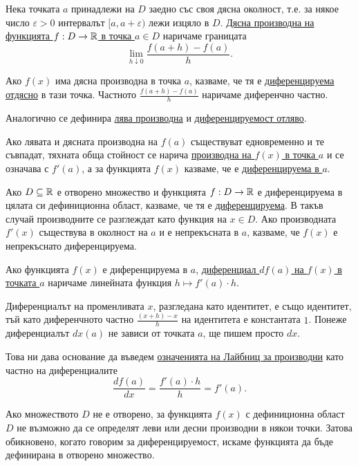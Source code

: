 \documentclass[numbers=endperiod, DIV=15, bibliography=totocnumbered]{scrartcl}
\begin{document}
\begin{definition}
  Нека точката $a$ принадлежи на $D$ заедно със своя дясна околност, т.е. за някое число $\varepsilon > 0$ интервалът $[a, a + \varepsilon)$ лежи изцяло в $D$. \uline{Дясна производна на функцията $f: D \to \mathbb{R}$ в точка $a \in D$} наричаме границата
  \begin{displaymath}
    \lim_{h \downarrow 0} \frac {f(a + h) - f(a)} h.
  \end{displaymath}

  Ако $f(x)$ има дясна производна в точка $a$, казваме, че тя е \uline{диференцируема отдясно} в тази точка.
  Частното $\frac {f(a + h) - f(a)} h$ наричаме диференчно частно.

  Аналогично се дефинира \uline{лява производна} и \uline{диференцируемост отляво}.

  Ако лявата и дясната производна на $f(a)$ съществуват едновременно и те съвпадат, тяхната обща стойност се нарича \uline{производна на $f(x)$ в точка $a$} и се означава с $f'(a)$, а за функцията $f(x)$ казваме, че е \uline{диференцируема в $a$}.

  Ако $D \subseteq \mathbb{R}$ е отворено множество и функцията $f: D \to \mathbb{R}$ е диференцируема в цялата си дефиниционна област, казваме, че тя е \uline{диференцируема}. В такъв случай производните се разглеждат като функция на $x \in D$. Ако производната $f'(x)$ съществува в околност на $a$ и е непрекъсната в $a$, казваме, че $f(x)$ е непрекъснато диференцируема.

  Ако функцията $f(x)$ е диференцируема в $a$, \uline{диференциал $df(a)$ на $f(x)$ в точката $a$} наричаме линейната функция $h \mapsto f'(a) \cdot h$.

  Диференциалът на променливата $x$, разгледана като идентитет, е също идентитет, тъй като диференчното частно $\frac {(x + h) - x} h$ на идентитета е константата $1$. Понеже диференциалът $dx(a)$ не зависи от точката $a$, ще пишем просто $dx$.

  Това ни дава основание да въведем \uline{означенията на Лайбниц за производни} като частно на диференциалите
  \begin{displaymath}
    \frac {df(a)} {dx} = \frac {f'(a) \cdot h} h = f'(a).
  \end{displaymath}
\end{definition}

\begin{note}
  Ако множеството $D$ не е отворено, за функцията $f(x)$ с дефиниционна област $D$ не възможно да се определят леви или десни производни в някои точки. Затова обикновено, когато говорим за диференцируемост, искаме функцията да бъде дефинирана в отворено множество.
\end{note}
\end{document}
